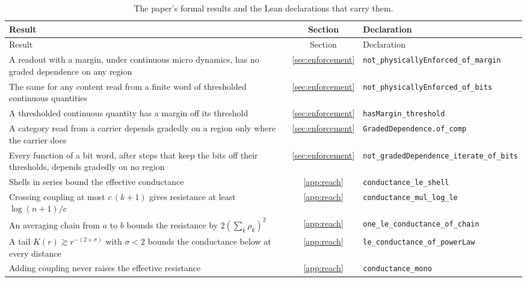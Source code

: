 \documentclass[12pt]{article}
\begin{document}
{\small
\begin{longtable}{>{\raggedright\arraybackslash}p{}c>{\raggedright\arraybackslash}p{}}
\caption{The paper's formal results and the Lean declarations that carry them.}
\label{tab:formal} \\
\hline
Result & Section & Declaration \\
\hline
\endfirsthead
\hline
Result & Section & Declaration \\
\hline
\endhead
A readout with a margin, under continuous micro dynamics, has no graded dependence on any region & \ref{sec:enforcement} & \texttt{not\_\allowbreak{}physicallyEnforced\_\allowbreak{}of\_\allowbreak{}margin} \\
The same for any content read from a finite word of thresholded continuous quantities & \ref{sec:enforcement} & \texttt{not\_\allowbreak{}physicallyEnforced\_\allowbreak{}of\_\allowbreak{}bits} \\
A thresholded continuous quantity has a margin off its threshold & \ref{sec:enforcement} & \texttt{hasMargin\_\allowbreak{}threshold} \\
A category read from a carrier depends gradedly on a region only where the carrier does & \ref{sec:enforcement} & \texttt{GradedDependence.of\_\allowbreak{}comp} \\
Every function of a bit word, after steps that keep the bits off their thresholds, depends gradedly on no region & \ref{sec:enforcement} & \texttt{not\_\allowbreak{}gradedDependence\_\allowbreak{}iterate\_\allowbreak{}of\_\allowbreak{}bits} \\
Shells in series bound the effective conductance & \ref{app:reach} & \texttt{conductance\_\allowbreak{}le\_\allowbreak{}shell} \\
Crossing coupling at most $c\,(k+1)$ gives resistance at least $\log(n+1)/c$ & \ref{app:reach} & \texttt{conductance\_\allowbreak{}mul\_\allowbreak{}log\_\allowbreak{}le} \\
An averaging chain from $a$ to $b$ bounds the resistance by $2(\sum_k \rho_k)^2$ & \ref{app:reach} & \texttt{one\_\allowbreak{}le\_\allowbreak{}conductance\_\allowbreak{}of\_\allowbreak{}chain} \\
A tail $K(r)\gtrsim r^{-(2+\sigma)}$ with $\sigma<2$ bounds the conductance below at every distance & \ref{app:reach} & \texttt{le\_\allowbreak{}conductance\_\allowbreak{}of\_\allowbreak{}powerLaw} \\
Adding coupling never raises the effective resistance & \ref{app:reach} & \texttt{conductance\_\allowbreak{}mono} \\

\end{longtable}}
\end{document}
